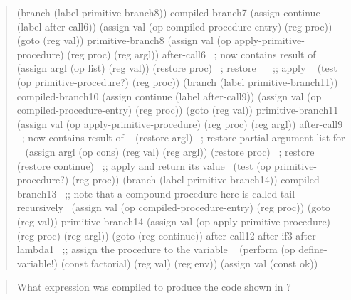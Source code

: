 \begin{quote}
\begin{smallscheme}
  (branch (label primitive-branch8))
compiled-branch7
  (assign continue (label after-call6))
  (assign val (op compiled-procedure-entry) (reg proc))
  (goto (reg val))
primitive-branch8
  (assign val
          (op apply-primitive-procedure)
          (reg proc)
          (reg argl))
after-call6   ~\textrm{;  now contains result of }~
  (assign argl (op list) (reg val))
  (restore proc) ~\textrm{; restore }~
~\textrm{;; apply }~
  (test (op primitive-procedure?) (reg proc))
  (branch (label primitive-branch11))
compiled-branch10
  (assign continue (label after-call9))
  (assign val (op compiled-procedure-entry) (reg proc))
  (goto (reg val))
primitive-branch11
  (assign val
          (op apply-primitive-procedure)
          (reg proc)
          (reg argl))
after-call9      ~\textrm{;  now contains result of }~
  (restore argl) ~\textrm{; restore partial argument list for \code{*}}~
  (assign argl (op cons) (reg val) (reg argl))
  (restore proc) ~\textrm{; restore \code{*}}~
  (restore continue)
~\textrm{;; apply \code{*} and return its value}~
  (test (op primitive-procedure?) (reg proc))
  (branch (label primitive-branch14))
compiled-branch13
~\textrm{;; note that a compound procedure here is called tail-recursively}~
  (assign val (op compiled-procedure-entry) (reg proc))
  (goto (reg val))
primitive-branch14
  (assign val
          (op apply-primitive-procedure)
          (reg proc)
          (reg argl))
  (goto (reg continue))
after-call12
after-if3
after-lambda1
~\textrm{;; assign the procedure to the variable }~
  (perform (op define-variable!)
           (const factorial)
           (reg val)
           (reg env))
  (assign val (const ok))
\end{smallscheme}

\end{quote}

\begin{quote}
 What expression was compiled to
produce the code shown in ?
\end{quote}

